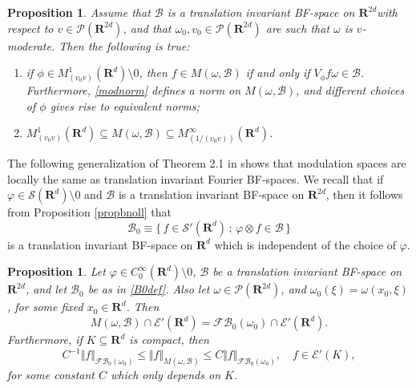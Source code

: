 \documentclass[12pt,a4paper,reqno]{amsart}
\numberwithin{equation}{section}
\numberwithin{thm}{section}
\newtheorem{prop}[thm]{Proposition}
\theoremstyle{definition}
\theoremstyle{remark}
\begin{document}
\begin{prop}\label{modproperties}
Assume that $\mathscr B$ is a translation invariant BF-space on ${\mathbf R^{{2d}}} $with respect to $v\in \mathscr P({\mathbf R^{{2d}}})$, and that
$\omega _0, v_0\in\mathscr{P}({\mathbf R^{{2d}}})$ are such that $\omega$
is $v$-moderate. Then the following is true:
\begin{enumerate}
\item if $\phi\in M^1_{(v_0v)}({\mathbf R^{{d}}}){\setminus {0}}$, then $f\in M(\omega
,\mathscr B)$ if and only if $V_\phi f \omega \in \mathscr
B$. Furthermore, \eqref{modnorm} defines a norm on $M(\omega
,\mathscr B)$, and different choices of $\phi$ gives rise to equivalent
norms;

{\vspace{0.1cm}}

\item $ M^1_{(v_0v)}({\mathbf R^{d}})\subseteq M(\omega ,\mathscr{B})\subseteq
M^{\infty}_{(1/(v_0v))}({\mathbf R^{d}})$.
\end{enumerate}
\end{prop}

\par

The following generalization of Theorem 2.1 in \cite{RSTT} shows that
modulation spaces are locally the same as translation invariant
Fourier BF-spaces. We recall that if ${\varphi} \in \mathscr S  ({\mathbf R^{d}}){\setminus 0}$ and $\mathscr B$ is a translation invariant BF-space  on ${\mathbf R^{{2d}}}$, then it follows from Proposition \ref{propbnoll} that
\begin{equation}\label{B0def}
\mathscr{B}_0 \equiv {\{ \, {f\in \mathscr
S'({\mathbf R^{d}})}\, ;\, {{\varphi} \otimes f \in \mathscr B}\, \} }
\end{equation}
is a translation invariant BF-space on ${\mathbf R^{d}}$ which is independent of
the choice of ${\varphi}$.

\par

\begin{prop}\label{propekvnorm}
Let ${\varphi} \in C_0^\infty ({\mathbf R^{d}}){\setminus 0}$,
$\mathscr B$ be a translation invariant BF-space  on ${\mathbf R^{{2d}}}$, and
let $\mathscr B_0$ be as in \eqref{B0def}. Also let $\omega \in
\mathscr P({\mathbf R^{{2d}}})$, and $\omega _0(\xi )=\omega (x_0,\xi )$,
for some fixed $x_0\in {\mathbf R^{d}}$. Then
$$
M(\omega ,\mathscr B)\cap \mathscr E'({\mathbf R^{d}}) = {\mathscr F\! \mathscr B} _0(\omega _0)\cap
\mathscr E'({\mathbf R^{d}}).
$$
Furthermore, if $K\subseteq {\mathbf R^{d}}$ is compact, then 
\begin{equation}\label{locest1}
C^{-1}{\Vert {f}\Vert _{{{\mathscr F\! \mathscr B} _0(\omega _0)}}}\le {\Vert f\Vert _{{M(\omega ,\mathscr B)}}}\le
C{\Vert {f}\Vert _{{{\mathscr F\! \mathscr B} _0(\omega _0)}}},\quad f\in \mathscr E'(K),
\end{equation}
for some constant $C$ which only depends on $K$.
\end{prop}
\end{document}
